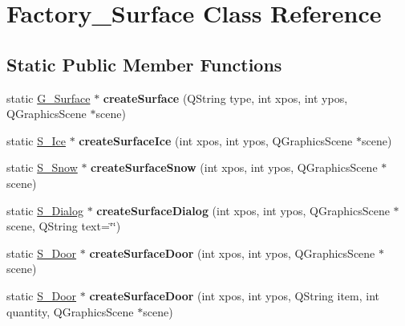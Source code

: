 \hypertarget{class_factory___surface}{}\section{Factory\+\_\+\+Surface Class Reference}
\label{class_factory___surface}
\subsection*{Static Public Member Functions}
\begin{DoxyCompactItemize}
\item 
\hypertarget{class_factory___surface_a4ff5816e81f603caf58d47d695a505d3}{}static \hyperlink{class_g___surface}{G\+\_\+\+Surface} $\ast$ {\bfseries create\+Surface} (Q\+String type, int xpos, int ypos, Q\+Graphics\+Scene $\ast$scene)\label{class_factory___surface_a4ff5816e81f603caf58d47d695a505d3}

\item 
\hypertarget{class_factory___surface_ab17210244006ed087a5d19da4d5fd4bd}{}static \hyperlink{class_s___ice}{S\+\_\+\+Ice} $\ast$ {\bfseries create\+Surface\+Ice} (int xpos, int ypos, Q\+Graphics\+Scene $\ast$scene)\label{class_factory___surface_ab17210244006ed087a5d19da4d5fd4bd}

\item 
\hypertarget{class_factory___surface_af8c720aacff1638f3be98c43790f1623}{}static \hyperlink{class_s___snow}{S\+\_\+\+Snow} $\ast$ {\bfseries create\+Surface\+Snow} (int xpos, int ypos, Q\+Graphics\+Scene $\ast$scene)\label{class_factory___surface_af8c720aacff1638f3be98c43790f1623}

\item 
\hypertarget{class_factory___surface_a00b899991e67f8b3ded65c759640d29d}{}static \hyperlink{class_s___dialog}{S\+\_\+\+Dialog} $\ast$ {\bfseries create\+Surface\+Dialog} (int xpos, int ypos, Q\+Graphics\+Scene $\ast$scene, Q\+String text=\char`\"{}\char`\"{})\label{class_factory___surface_a00b899991e67f8b3ded65c759640d29d}

\item 
\hypertarget{class_factory___surface_a8f31a202ed9fae218b3f517c08f43723}{}static \hyperlink{class_s___door}{S\+\_\+\+Door} $\ast$ {\bfseries create\+Surface\+Door} (int xpos, int ypos, Q\+Graphics\+Scene $\ast$scene)\label{class_factory___surface_a8f31a202ed9fae218b3f517c08f43723}

\item 
\hypertarget{class_factory___surface_abb875c8764cc75b19569160d84639309}{}static \hyperlink{class_s___door}{S\+\_\+\+Door} $\ast$ {\bfseries create\+Surface\+Door} (int xpos, int ypos, Q\+String item, int quantity, Q\+Graphics\+Scene $\ast$scene)\label{class_factory___surface_abb875c8764cc75b19569160d84639309}


\end{DoxyCompactItemize}

